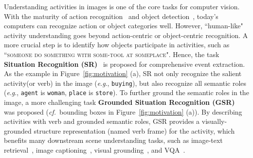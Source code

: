 \documentclass[letterpaper]{article} %
\newcommand{\eg}{\textit{e}.\textit{g}.}
\newcommand{\cf}{\textit{cf.}}
\begin{document}
Understanding activities in images is one of the core tasks for computer vision. 
With the maturity of action recognition~\cite{carreira2017quo, wang2016temporal} and object detection~\cite{ren2015faster}, today's computers can recognize action or object categories well. 
However, ``human-like" activity understanding goes beyond action-centric or object-centric recognition. 
A more crucial step is to identify how objects participate in activities, such as ``\textsc{someone do something with some-tool at someplace}". 
Hence, the task \textbf{Situation Recognition (SR)}~\cite{yatskar2016situation} is proposed for comprehensive event extraction.  
As the example in Figure~\ref{fig:motivation} (a), SR not only recognize the salient activity(or verb) in the image (\eg, \texttt{buying}), but also recognize all semantic roles (\eg, \texttt{agent} is \texttt{woman}, \texttt{place} is \texttt{store}). To further ground the semantic roles in the image, a more challenging task \textbf{Grounded Situation Recognition (GSR)}~\cite{pratt2020grounded} was proposed (\cf~bounding boxes in Figure~\ref{fig:motivation} (a)). By describing activities with verb and grounded semantic roles, GSR provides a visually-grounded structure representation (named verb frame) for the activity, which benefits many downstream scene understanding tasks, such as image-text retrieval~\cite{gordo2016deep, noh2017large}, image captioning~\cite{mallya2017recurrent,chen2021human,chen2017sca}, visual grounding~\cite{chen2021ref}, and VQA~\cite{cadene2019murel,Chen_2020_CVPR,chen2021counterfactual,xiao2022video}.
\end{document}
